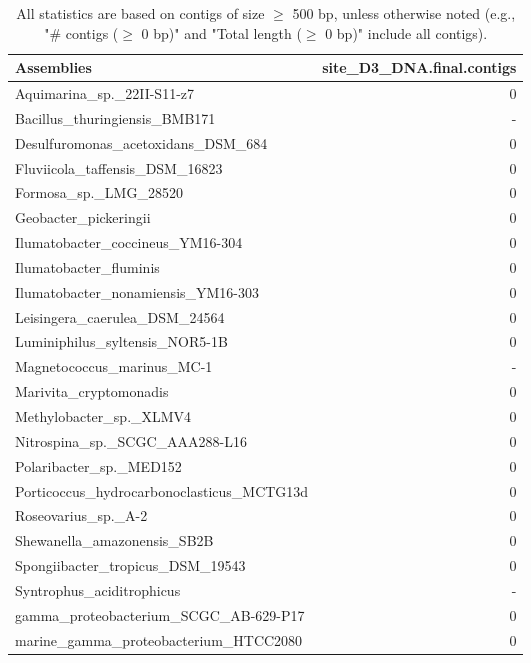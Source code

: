 \documentclass[12pt,a4paper]{article}
\begin{document}
\begin{table}[ht]
\begin{center}
\caption{All statistics are based on contigs of size $\geq$ 500 bp, unless otherwise noted (e.g., "\# contigs ($\geq$ 0 bp)" and "Total length ($\geq$ 0 bp)" include all contigs).}
\begin{tabular}{|l*{1}{|r}|}
\hline
Assemblies & site\_D3\_DNA.final.contigs \\ \hline
Aquimarina\_sp.\_22II-S11-z7 & 0 \\ \hline
Bacillus\_thuringiensis\_BMB171 & - \\ \hline
Desulfuromonas\_acetoxidans\_DSM\_684 & 0 \\ \hline
Fluviicola\_taffensis\_DSM\_16823 & 0 \\ \hline
Formosa\_sp.\_LMG\_28520 & 0 \\ \hline
Geobacter\_pickeringii & 0 \\ \hline
Ilumatobacter\_coccineus\_YM16-304 & 0 \\ \hline
Ilumatobacter\_fluminis & 0 \\ \hline
Ilumatobacter\_nonamiensis\_YM16-303 & 0 \\ \hline
Leisingera\_caerulea\_DSM\_24564 & 0 \\ \hline
Luminiphilus\_syltensis\_NOR5-1B & 0 \\ \hline
Magnetococcus\_marinus\_MC-1 & - \\ \hline
Marivita\_cryptomonadis & 0 \\ \hline
Methylobacter\_sp.\_XLMV4 & 0 \\ \hline
Nitrospina\_sp.\_SCGC\_AAA288-L16 & 0 \\ \hline
Polaribacter\_sp.\_MED152 & 0 \\ \hline
Porticoccus\_hydrocarbonoclasticus\_MCTG13d & 0 \\ \hline
Roseovarius\_sp.\_A-2 & 0 \\ \hline
Shewanella\_amazonensis\_SB2B & 0 \\ \hline
Spongiibacter\_tropicus\_DSM\_19543 & 0 \\ \hline
Syntrophus\_aciditrophicus & - \\ \hline
gamma\_proteobacterium\_SCGC\_AB-629-P17 & 0 \\ \hline
marine\_gamma\_proteobacterium\_HTCC2080 & 0 \\ \hline
\end{tabular}
\end{center}
\end{table}
\end{document}
